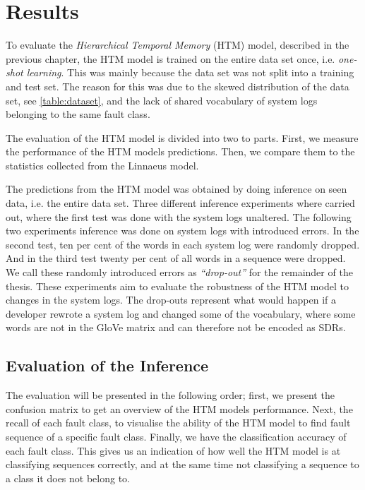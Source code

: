 \chapter{Results}
\label{chp_res}


To evaluate the \textit{Hierarchical Temporal Memory} (HTM) model, described in the previous chapter, the HTM model is trained on the entire data set once, i.e. \textit{one-shot learning}. This was mainly because the data set was not split into a training and test set. The reason for this was due to the skewed distribution of the data set, see \autoref{table:dataset}, and the lack of shared vocabulary of system logs belonging to the same fault class.


The evaluation of the HTM model is divided into two to parts. First, we measure the performance of the HTM models predictions. Then, we compare them to the statistics collected from the Linnaeus model.


The predictions from the HTM model was obtained by doing inference on seen data, i.e. the entire data set. Three different inference experiments where carried out, where the first test was done with the system logs unaltered. The following two experiments inference was done on system logs with introduced errors. In the second test, ten per cent of the words in each system log were randomly dropped. And in the third test twenty per cent of all words in a sequence were dropped. We call these randomly introduced errors as \textit{``drop-out''} for the remainder of the thesis. These experiments aim to evaluate the robustness of the HTM model to changes in the system logs. The drop-outs represent what would happen if a developer rewrote a system log and changed some of the vocabulary, where some words are not in the GloVe matrix and can therefore not be encoded as SDRs.



\section{Evaluation of the Inference}
The evaluation will be presented in the following order; first, we present the confusion matrix to get an overview of the HTM models performance. Next, the recall of each fault class, to visualise the ability of the HTM model to find fault sequence of a specific fault class. Finally, we have the classification accuracy of each fault class. This gives us an indication of how well the HTM model is at classifying sequences correctly, and at the same time not classifying a sequence to a class it does not belong to.



